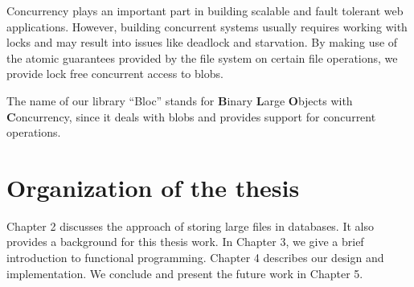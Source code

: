 Concurrency plays an important part in building scalable and fault tolerant web applications. However, building concurrent systems usually requires working with locks and may result into issues like deadlock and starvation. By making use of the atomic guarantees provided by the file system on certain file operations, we provide lock free concurrent access to blobs.

The name of our library ``Bloc'' stands for \textbf{B}inary \textbf{L}arge \textbf{O}bjects with \textbf{C}oncurrency, since it deals with blobs and provides support for concurrent operations.

\section{Organization of the thesis}
Chapter 2 discusses the approach of storing large files in databases. It also provides a background for this thesis work. In Chapter 3, we give a brief introduction to functional programming. Chapter 4 describes our design and implementation. We conclude and present the future work in Chapter 5.
